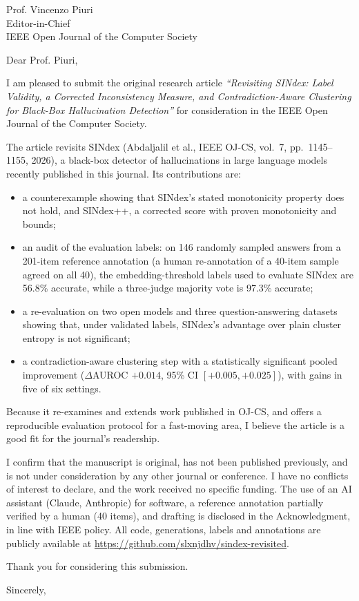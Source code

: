 \documentclass[11pt]{letter}
\date{\today}
\begin{document}
\begin{letter}{Prof. Vincenzo Piuri\\Editor-in-Chief\\IEEE Open Journal of the Computer Society}
\opening{Dear Prof. Piuri,}

I am pleased to submit the original research article \emph{``Revisiting SINdex: Label Validity, a Corrected Inconsistency Measure, and Contradiction-Aware Clustering for Black-Box Hallucination Detection''} for consideration in the IEEE Open Journal of the Computer Society.

The article revisits SINdex (Abdaljalil et al., IEEE OJ-CS, vol.~7, pp.~1145--1155, 2026), a black-box detector of hallucinations in large language models recently published in this journal. Its contributions are:
\begin{itemize}
\item a counterexample showing that SINdex's stated monotonicity property does not hold, and SINdex++, a corrected score with proven monotonicity and bounds;
\item an audit of the evaluation labels: on 146 randomly sampled answers from a 201-item reference annotation (a human re-annotation of a 40-item sample agreed on all 40), the embedding-threshold labels used to evaluate SINdex are 56.8\% accurate, while a three-judge majority vote is 97.3\% accurate;
\item a re-evaluation on two open models and three question-answering datasets showing that, under validated labels, SINdex's advantage over plain cluster entropy is not significant;
\item a contradiction-aware clustering step with a statistically significant pooled improvement ($\Delta$AUROC $+0.014$, 95\% CI $[+0.005, +0.025]$), with gains in five of six settings.
\end{itemize}
Because it re-examines and extends work published in OJ-CS, and offers a reproducible evaluation protocol for a fast-moving area, I believe the article is a good fit for the journal's readership.

I confirm that the manuscript is original, has not been published previously, and is not under consideration by any other journal or conference. I have no conflicts of interest to declare, and the work received no specific funding. The use of an AI assistant (Claude, Anthropic) for software, a reference annotation partially verified by a human (40 items), and drafting is disclosed in the Acknowledgment, in line with IEEE policy. All code, generations, labels and annotations are publicly available at \url{https://github.com/slxnjdhv/sindex-revisited}.

Thank you for considering this submission.

\closing{Sincerely,}
\end{letter}
\end{document}
